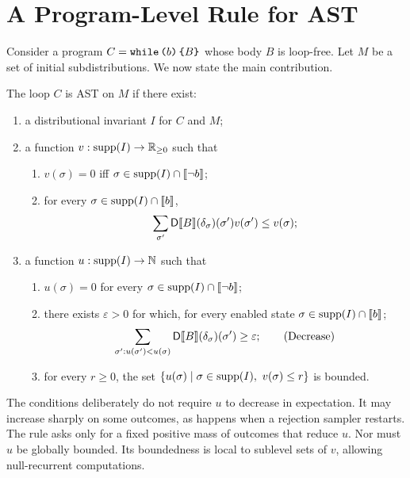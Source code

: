 \section{A Program-Level Rule for AST}
\label{sec:rule}

Consider a program $C=\textnormal{\texttt{while}}\,\textnormal{\texttt{(}} b\textnormal{\texttt{)}}\,\textnormal{\texttt{\{}} B\textnormal{\texttt{\}}}$ whose body $B$ is loop-free. Let $M$ be a set of initial subdistributions. We now state the main contribution.

\begin{theorem}
\label{thm:program-rule}
The loop $C$ is AST on $M$ if there exist:
\begin{enumerate}[label=(\arabic*)]
 \item a distributional invariant $I$ for $C$ and $M$;
 \item a function $v:\textnormal{supp}(I)\to\mathbb{R}_{\geq0}$ such that
   \begin{enumerate}[label=(\alph*)]
    \item $v(\sigma)=0$ iff $\sigma\in\textnormal{supp}(I)\cap\llbracket\neg b\rrbracket$;
    \item for every $\sigma\in\textnormal{supp}(I)\cap\llbracket b\rrbracket$,
    \[
      \sum_{\sigma'}\mathsf{D}\llbracket B\rrbracket(\delta_{\sigma})(\sigma')v(\sigma')\leq v(\sigma);
    \]
   \end{enumerate}
 \item a function $u:\textnormal{supp}(I)\to\mathbb{N}$ such that
   \begin{enumerate}[label=(\alph*)]
    \item $u(\sigma)=0$ for every $\sigma\in\textnormal{supp}(I)\cap\llbracket\neg b\rrbracket$;
    \item there exists $\varepsilon>0$ for which, for every enabled state $\sigma\in\textnormal{supp}(I)\cap\llbracket b\rrbracket$;
    \[
      \sum_{\sigma':u(\sigma')<u(\sigma)}
        \mathsf{D}\llbracket B\rrbracket(\delta_{\sigma})(\sigma')\geq\varepsilon;
      \tag{Decrease}
    \]
    \item for every $r\geq0$, the set
    $\{u(\sigma)\mid \sigma\in\supp(I),\ v(\sigma)\leq r\}$ is bounded.
   \end{enumerate}
\end{enumerate}
\end{theorem}

The conditions deliberately do not require $u$ to decrease in expectation. It may increase sharply on some outcomes, as happens when a rejection sampler restarts. The rule asks only for a fixed positive mass of outcomes that reduce $u$. Nor must $u$ be globally bounded. Its boundedness is local to sublevel sets of $v$, allowing null-recurrent computations.

